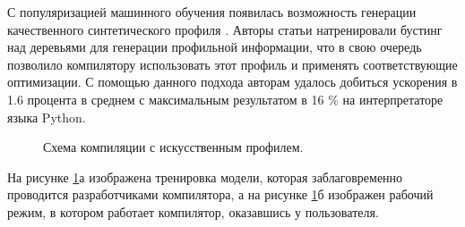 С популяризацией машинного обучения появилась возможность генерации качественного синтетического профиля \cite{rotem2021profile}. Авторы статьи натренировали бустинг над деревьями для генерации профильной информации, что в свою очередь позволило компилятору использовать этот профиль и применять соответствующие оптимизации. С помощью данного подхода авторам удалось добиться ускорения в 1.6 процента в среднем с максимальным результатом в 16 \%  на интерпретаторе языка Python. 
 \begin{figure}[htbp]
	\centering
	
	\caption{Схема компиляции с искусственным профилем.}
	\label{partReview:pgo_without profile}
\end{figure}
На рисунке \ref{partReview:pgo_without profile}а изображена тренировка модели, которая заблаговременно проводится разработчиками компилятора, а на рисунке \ref{partReview:pgo_without profile}б изображен рабочий режим, в котором работает компилятор, оказавшись у пользователя.

\FloatBarrier
